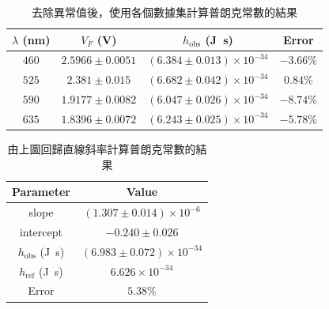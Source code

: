 \begin{table}[htb!]
\centering
\caption{去除異常值後，使用各個數據集計算普朗克常數的結果}
\begin{tabular}{cccc}
\toprule
$\lambda$ (\unit{\nm}) & $V_F$ (\unit{\V}) & $h_{\text{obs}}$ (\unit{\J\s}) & Error \\
\midrule
$460$ & $2.5966 \pm 0.0051$ & $(6.384 \pm 0.013)\times 10^{-34}$ & $-3.66\%$ \\
$525$ & $2.381 \pm 0.015$ & $(6.682 \pm 0.042)\times 10^{-34}$ & $0.84\%$ \\
$590$ & $1.9177 \pm 0.0082$ & $(6.047 \pm 0.026)\times 10^{-34}$ & $-8.74\%$ \\
$635$ & $1.8396 \pm 0.0072$ & $(6.243 \pm 0.025)\times 10^{-34}$ & $-5.78\%$ \\
\bottomrule
\end{tabular}
\end{table}
\begin{table}[htb!]
\centering
\caption{由上圖回歸直線斜率計算普朗克常數的結果}
\begin{tabular}{cc}
\toprule
Parameter & Value \\
\midrule
slope & $(1.307 \pm 0.014)\times 10^{-6}$ \\
intercept & $-0.240 \pm 0.026$ \\
$h_{\text{obs}}$ (\unit{\J\s}) & $(6.983 \pm 0.072)\times 10^{-34}$ \\
$h_{\text{ref}}$ (\unit{\J\s}) & $6.626\times 10^{-34}$ \\
Error & $5.38\%$ \\
\bottomrule
\end{tabular}
\end{table}
